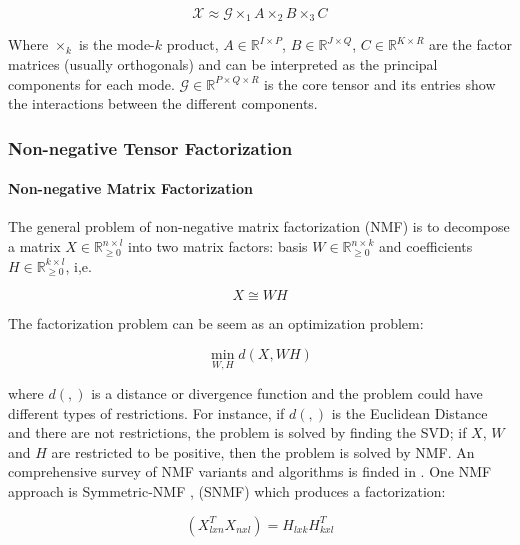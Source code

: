 \documentclass[letterpaper,12pt]{article}
\begin{document}
\begin{equation}
 \mathcal{X}\approx \mathcal{G}\times_1 A \times_2 B \times_3 C
\end{equation}

Where $\times_k$ is the mode-$k$ product, $A\in \mathbb{R}^{I\times P}$, $B\in \mathbb{R}^{J\times Q}$, $C\in \mathbb{R}^{K\times R}$ are the factor matrices (usually orthogonals) and can be interpreted as the principal components for each mode. $\mathcal{G}\in\mathbb{R}^{P\times Q \times R}$ is the core tensor and its entries show the interactions between the different components.

\subsubsection{Non-negative Tensor Factorization}

\paragraph{Non-negative Matrix Factorization}

The general problem of non-negative matrix factorization (NMF) is to decompose a matrix $X \in \mathbb{R}_{\geq 0}^{n\times l}$ into two matrix factors: basis $W \in \mathbb{R}_{\geq 0}^{n\times k}$  and coefficients $H \in \mathbb{R}_{\geq 0}^{k\times l}$, i,e.

\begin{equation}
X\cong W H\label{eq:matrix-factorization}
\end{equation}
 
The factorization problem can be seem as an optimization problem:

\begin{equation}
\min_{W,H}d(X,WH)\label{eq:objective-function-factorization}
\end{equation}


where $d(,)$ is a distance or divergence function and the problem could have different types of restrictions. For instance, if $d(,)$
is the Euclidean Distance and there are not restrictions, the problem is solved by finding the SVD; if $X$, $W$ and $H$ are restricted
to be positive, then the problem is solved by NMF. An comprehensive survey of NMF variants and algorithms is finded in \cite{Wang2013}.
One NMF approach is Symmetric-NMF \cite{Ding2005}, (SNMF) which produces a factorization: 

\begin{equation}
(X_{lxn}^{T}X_{nxl})=H_{lxk}H_{kxl}^{T}\label{eq:symmetric-nmf}
\end{equation}
\end{document}
